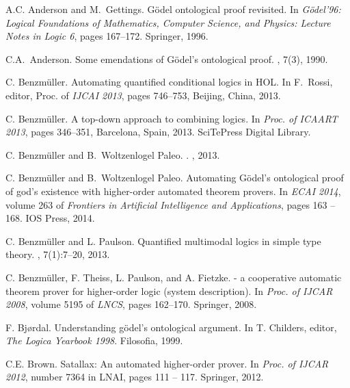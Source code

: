 \documentclass{llncs}
\begin{document}
\begin{thebibliography}{10}

A.C. Anderson and M.~Gettings.
\newblock G\"odel ontological proof revisited.
\newblock In {\em {G\"odel'96: Logical Foundations of Mathematics, Computer
  Science, and Physics: Lecture Notes in Logic 6}}, pages 167--172. {Springer},
  1996.

C.A.~Anderson.
\newblock Some emendations of {G{\"o}del's} ontological proof.
, 7(3), 1990.

C. Benzm{\"u}ller.
\newblock Automating quantified conditional logics in {HOL}.
\newblock In F.~Rossi, editor, Proc. of {\em IJCAI 2013}, pages 746--753, Beijing, China, 2013.

C. Benzm{\"u}ller.
\newblock A top-down approach to combining logics.
\newblock In {\em Proc. of ICAART 2013}, pages 346--351, Barcelona, Spain, 2013.
  SciTePress Digital Library.

C. Benzm\"uller and B.~Woltzenlogel Paleo.
.
, 2013.

C. Benzm{\"u}ller and B.~Woltzenlogel Paleo.
\newblock Automating {G\"{o}del's} ontological proof of god's existence with
  higher-order automated theorem provers.
\newblock In 
  {\em ECAI 2014}, volume 263 of {\em Frontiers in Artificial Intelligence and
  Applications}, pages 163 -- 168. IOS Press, 2014.

C. Benzm{\"u}ller and L. Paulson.
\newblock Quantified multimodal logics in simple type theory.
,
  7(1):7--20, 2013.

C. Benzm{\"u}ller, F. Theiss, L. Paulson, and A. Fietzke.
 - a cooperative automatic theorem prover for higher-order
  logic (system description).
\newblock In 
  {\em Proc. of IJCAR 2008}, volume 5195 of {\em
  LNCS}, pages 162--170. Springer, 2008.

F. Bjørdal.
\newblock Understanding gödel’s ontological argument.
\newblock In T. Childers, editor, {\em The Logica Yearbook 1998}.
  Filosofia, 1999.


C.E. Brown.
\newblock Satallax: An automated higher-order prover.
\newblock In {\em Proc. of IJCAR 2012}, number 7364 in LNAI, pages 111 -- 117.
  Springer, 2012.



\end{thebibliography}
\end{document}
